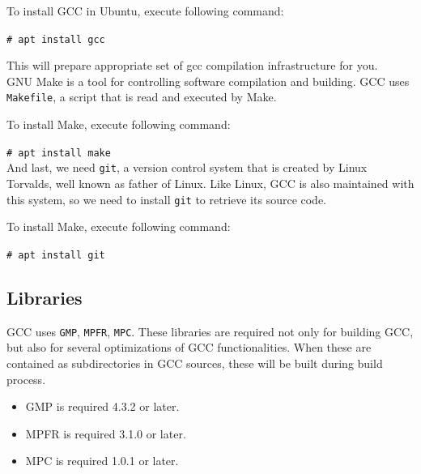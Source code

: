 \documentclass{article}
\begin{document}
\par To install GCC in Ubuntu, execute following command: \\

\par \texttt{\# apt install gcc} \\

\par This will prepare appropriate set of gcc compilation infrastructure for you. \\


GNU Make is a tool for controlling software compilation and building. GCC uses \texttt{Makefile},
a script that is read and executed by Make. \\

\par To install Make, execute following command: \\

\par \texttt{\# apt install make} \\

And last, we need \texttt{git}, a version control system that is created by Linux Torvalds, well known
as father of Linux. Like Linux, GCC is also maintained with this system, so we need to install \texttt{git}
to retrieve its source code.\\

\par To install Make, execute following command: \\

\par \texttt{\# apt install git} \\

\subsection{Libraries}
GCC uses \texttt{GMP}, \texttt{MPFR}, \texttt{MPC}. These libraries are required not only 
for building GCC, but also for several optimizations of GCC functionalities. When these are contained as 
subdirectories in GCC sources, these will be built during build process.

\begin{itemize}
    \item GMP is required 4.3.2 or later.
    \item MPFR is required 3.1.0 or later.
    \item MPC is required 1.0.1 or later.
\end{itemize}
\end{document}
